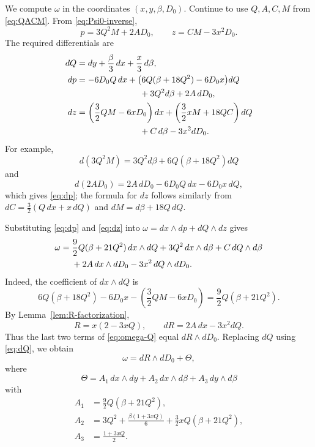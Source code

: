 \documentclass[11pt]{article}
\theoremstyle{remark}
\begin{document}
We compute \(\omega\) in the coordinates \((x,y,\beta,D_0)\).  Continue to
use \(Q,A,C,M\) from \eqref{eq:QACM}.  From
\eqref{eq:Psi0-inverse},
\begin{equation}\label{eq:pz-inverse-short}
  p=3Q^2M+2AD_0,
  \qquad
  z=CM-3x^2D_0.
\end{equation}
The required differentials are
\begin{align}
  dQ&=dy+\frac{\beta}{3}\,dx+\frac{x}{3}\,d\beta,
  \label{eq:dQ}\\
  dp&=-6D_0Q\,dx
     +\bigl(6Q(\beta+18Q^2)-6D_0x\bigr)dQ\notag\\
     &\hspace{2.6cm}+3Q^2d\beta+2A\,dD_0,
     \label{eq:dp}\\
  dz&=\left(\frac32QM-6xD_0\right)dx
     +\left(\frac32xM+18QC\right)dQ\notag\\
     &\hspace{2.6cm}+C\,d\beta-3x^2dD_0.
     \label{eq:dz}
\end{align}
For example,
\[
  d(3Q^2M)=3Q^2d\beta+6Q(\beta+18Q^2)dQ
\]
and
\[
  d(2AD_0)=2A\,dD_0-6D_0Q\,dx-6D_0x\,dQ,
\]
which gives \eqref{eq:dp}; the formula for \(dz\) follows similarly from
\(dC=\frac32(Q\,dx+x\,dQ)\) and \(dM=d\beta+18Q\,dQ\).

Substituting \eqref{eq:dp} and \eqref{eq:dz} into
\(\omega=dx\wedge dp+dQ\wedge dz\) gives
\begin{align}
  \omega={}&\frac92Q(\beta+21Q^2)\,dx\wedge dQ
       +3Q^2\,dx\wedge d\beta
       +C\,dQ\wedge d\beta\notag\\
      &+2A\,dx\wedge dD_0-3x^2\,dQ\wedge dD_0.
      \label{eq:omega-Q}
\end{align}
Indeed, the coefficient of \(dx\wedge dQ\) is
\[
  6Q(\beta+18Q^2)-6D_0x
  -\left(\frac32QM-6xD_0\right)
  =\frac92Q(\beta+21Q^2).
\]
By Lemma~\ref{lem:R-factorization},
\begin{equation}\label{eq:R-Q}
  R=x(2-3xQ),
  \qquad
  dR=2A\,dx-3x^2dQ.
\end{equation}
Thus the last two terms of \eqref{eq:omega-Q} equal
\(dR\wedge dD_0\).  Replacing \(dQ\) using \eqref{eq:dQ}, we obtain
\begin{equation}\label{eq:omega-split}
  \omega=dR\wedge dD_0+\Theta,
\end{equation}
where
\begin{equation}\label{eq:Theta-def}
  \Theta=A_1\,dx\wedge dy+A_2\,dx\wedge d\beta
         +A_3\,dy\wedge d\beta
\end{equation}
with
\begin{align}
  A_1&=\frac92Q(\beta+21Q^2),\label{eq:A1}\\
  A_2&=3Q^2+\frac{\beta(1+3xQ)}6
            +\frac32xQ(\beta+21Q^2),\label{eq:A2}\\
  A_3&=\frac{1+3xQ}{2}.\label{eq:A3}
\end{align}
\end{document}
